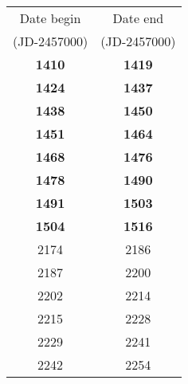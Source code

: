 \begin{table*}
\begin{tabular}{cc}
\hline
%
Date begin  & Date end \\ 
(JD-2457000) & (JD-2457000) \\ \hline
%
  {\bf 1410} & {\bf 1419} \\  
  {\bf 1424} & {\bf 1437} \\  
  {\bf 1438} & {\bf 1450} \\  
  {\bf 1451} & {\bf 1464} \\  
  {\bf 1468} & {\bf 1476} \\  
  {\bf 1478} & {\bf 1490} \\  
  {\bf 1491} & {\bf 1503} \\  
  {\bf 1504} & {\bf 1516} \\  
       2174  &      2186 \\  
       2187  &      2200 \\  
       2202  &      2214 \\  
       2215  &      2228 \\  
       2229  &      2241 \\  
       2242  &      2254 \\  
%
\hline
\end{tabular}
\end{table*}
